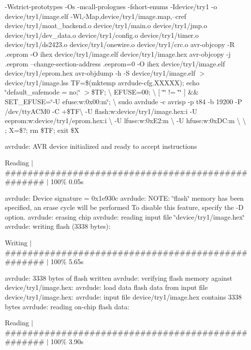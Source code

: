 -\/\-Wstrict-\/prototypes -\/\-Os -\/mcall-\/prologues -\/fshort-\/enums -\/\-Idevice/try1 -\/o device/try1/image.\-elf -\/\-Wl,-\/\-Map,device/try1/image.\-map,--cref device/try1/moat\-\_\-backend.\-o device/try1/main.\-o device/try1/jmp.\-o device/try1/dev\-\_\-data.\-o device/try1/config.\-o device/try1/timer.\-o device/try1/ds2423.\-o device/try1/onewire.\-o device/try1/crc.\-o avr-\/objcopy -\/\-R .eeprom -\/\-O ihex device/try1/image.\-elf device/try1/image.\-hex avr-\/objcopy -\/j .eeprom --change-\/section-\/address .eeprom=0 -\/\-O ihex device/try1/image.\-elf device/try1/eprom.\-hex avr-\/objdump -\/h -\/\-S device/try1/image.\-elf $>$ device/try1/image.\-lss T\-F=\$(mktemp avrdude-\/cfg.\-X\-X\-X\-X\-X); echo \char`\"{}default\-\_\-safemode = no;\char`\"{} $>$\$\-T\-F; \textbackslash{} E\-F\-U\-S\-E=00; \textbackslash{} \mbox{[} \char`\"{}\char`\"{} != \char`\"{}\char`\"{} \mbox{]} \&\& S\-E\-T\-\_\-\-E\-F\-U\-S\-E=\char`\"{}-\/\-U efuse\-:w\-:0x00\-:m\char`\"{}; \textbackslash{} sudo avrdude -\/c avrisp -\/p t84 -\/b 19200 -\/\-P /dev/tty\-A\-C\-M0 -\/\-C +\$\-T\-F\textbackslash{} -\/\-U flash\-:w\-:device/try1/image.\-hex\-:i -\/\-U eeprom\-:w\-:device/try1/eprom.\-hex\-:i \textbackslash{} -\/\-U lfuse\-:w\-:0x\-E2\-:m \textbackslash{} -\/\-U hfuse\-:w\-:0x\-D\-C\-:m \textbackslash{} \textbackslash{} ; X=\$?; rm \$\-T\-F; exit \$\-X

avrdude\-: A\-V\-R device initialized and ready to accept instructions

Reading $\vert$ \#\#\#\#\#\#\#\#\#\#\#\#\#\#\#\#\#\#\#\#\#\#\#\#\#\#\#\#\#\#\#\#\#\#\#\#\#\#\#\#\#\#\#\#\#\#\#\#\#\# $\vert$ 100\% 0.\-05s

avrdude\-: Device signature = 0x1e930c avrdude\-: N\-O\-T\-E\-: \char`\"{}flash\char`\"{} memory has been specified, an erase cycle will be performed To disable this feature, specify the -\/\-D option. avrdude\-: erasing chip avrdude\-: reading input file \char`\"{}device/try1/image.\-hex\char`\"{} avrdude\-: writing flash (3338 bytes)\-:

Writing $\vert$ \#\#\#\#\#\#\#\#\#\#\#\#\#\#\#\#\#\#\#\#\#\#\#\#\#\#\#\#\#\#\#\#\#\#\#\#\#\#\#\#\#\#\#\#\#\#\#\#\#\# $\vert$ 100\% 5.\-65s

avrdude\-: 3338 bytes of flash written avrdude\-: verifying flash memory against device/try1/image.\-hex\-: avrdude\-: load data flash data from input file device/try1/image.\-hex\-: avrdude\-: input file device/try1/image.\-hex contains 3338 bytes avrdude\-: reading on-\/chip flash data\-:

Reading $\vert$ \#\#\#\#\#\#\#\#\#\#\#\#\#\#\#\#\#\#\#\#\#\#\#\#\#\#\#\#\#\#\#\#\#\#\#\#\#\#\#\#\#\#\#\#\#\#\#\#\#\# $\vert$ 100\% 3.\-90s


